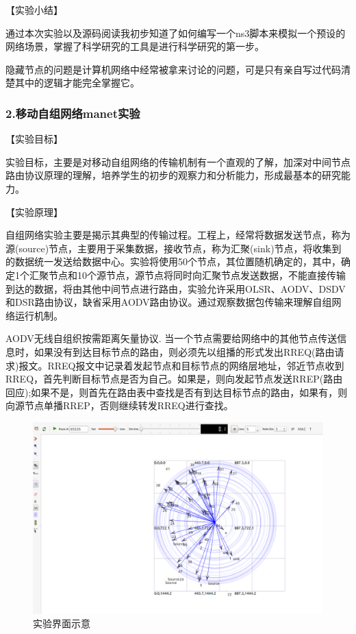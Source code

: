 \documentclass[lang=cn,11pt,a4paper,cite=authoryear]{elegantpaper}
\begin{document}
【实验小结】

通过本次实验以及源码阅读我初步知道了如何编写一个ns3脚本来模拟一个预设的网络场景，掌握了科学研究的工具是进行科学研究的第一步。

隐藏节点的问题是计算机网络中经常被拿来讨论的问题，可是只有亲自写过代码清楚其中的逻辑才能完全掌握它。

\subsubsection{2.移动自组网络manet实验}

【实验目标】

实验目标，主要是对移动自组网络的传输机制有一个直观的了解，加深对中间节点路由协议原理的理解，培养学生的初步的观察力和分析能力，形成最基本的研究能力。

【实验原理】

自组网络实验主要是揭示其典型的传输过程。工程上，经常将数据发送节点，称为源(source)节点，主要用于采集数据，接收节点，称为汇聚(sink)节点，将收集到的数据统一发送给数据中心。实验将使用50个节点，其位置随机确定的，其中，确定1个汇聚节点和10个源节点，源节点将同时向汇聚节点发送数据，不能直接传输到达的数据，将由其他中间节点进行路由，实验允许采用OLSR、AODV、DSDV和DSR路由协议，缺省采用AODV路由协议。通过观察数据包传输来理解自组网络运行机制。

AODV无线自组织按需距离矢量协议. 当一个节点需要给网络中的其他节点传送信息时，如果没有到达目标节点的路由，则必须先以组播的形式发出RREQ(路由请求)报文。RREQ报文中记录着发起节点和目标节点的网络层地址，邻近节点收到RREQ，首先判断目标节点是否为自己。如果是，则向发起节点发送RREP(路由回应);如果不是，则首先在路由表中查找是否有到达目标节点的路由，如果有，则向源节点单播RREP，否则继续转发RREQ进行查找。


\begin{figure}[htbp]
	\centering
	\includegraphics[width=0.8\linewidth]{image/screenshot023}
	\caption{实验界面示意}
	\label{fig:screenshot023}
\end{figure}
\end{document}

